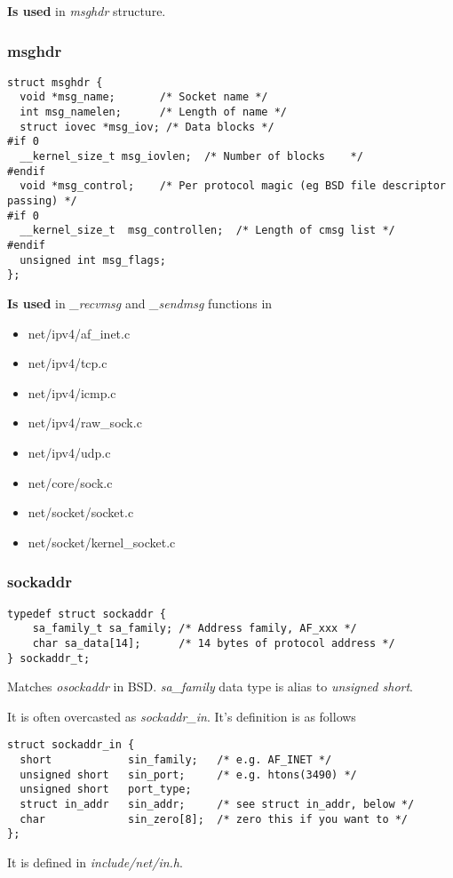 \documentclass[12pt,a4paper]{article}
\begin{document}
{\bf Is used} in {\it msghdr} structure.

\subsubsection{msghdr}
\label{sec:socket_c_msghdr}
\begin{verbatim}
struct msghdr {
  void *msg_name;       /* Socket name */
  int msg_namelen;      /* Length of name */
  struct iovec *msg_iov; /* Data blocks */
#if 0
  __kernel_size_t msg_iovlen;  /* Number of blocks    */
#endif
  void *msg_control;    /* Per protocol magic (eg BSD file descriptor passing) */
#if 0
  __kernel_size_t  msg_controllen;  /* Length of cmsg list */
#endif
  unsigned int msg_flags;
};
\end{verbatim}
{\bf Is used} in {\it *\_recvmsg} and {\it *\_sendmsg} functions in
\begin{itemize}
\item   net/ipv4/af\_inet.c
\item   net/ipv4/tcp.c
\item   net/ipv4/icmp.c
\item   net/ipv4/raw\_sock.c
\item   net/ipv4/udp.c
\item   net/core/sock.c
\item   net/socket/socket.c
\item   net/socket/kernel\_socket.c
\end{itemize}

\subsubsection{sockaddr}
\label{sec:socket_c_sockaddr}
\begin{verbatim}
typedef struct sockaddr {
	sa_family_t sa_family; /* Address family, AF_xxx */
	char sa_data[14];      /* 14 bytes of protocol address */
} sockaddr_t;
\end{verbatim}
Matches {\it osockaddr} in BSD. {\it sa\_family} data type is alias to
{\it unsigned short}.

It is often overcasted as {\it sockaddr\_in}. It's definition is as follows
\begin{verbatim}
struct sockaddr_in {
  short            sin_family;   /* e.g. AF_INET */
  unsigned short   sin_port;     /* e.g. htons(3490) */
  unsigned short   port_type;
  struct in_addr   sin_addr;     /* see struct in_addr, below */
  char             sin_zero[8];  /* zero this if you want to */
};
\end{verbatim}
It is defined in {\it include/net/in.h}.
\end{document}
